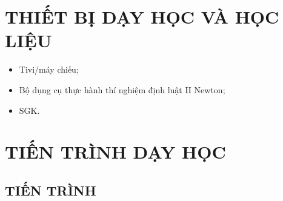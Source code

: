 \section{THIẾT BỊ DẠY HỌC VÀ HỌC LIỆU}
\begin{itemize}
	\item Tivi/máy chiếu;
	\item Bộ dụng cụ thực hành thí nghiệm định luật II Newton;
	\item SGK.
\end{itemize}
\section{TIẾN TRÌNH DẠY HỌC}
\subsection{TIẾN TRÌNH}
